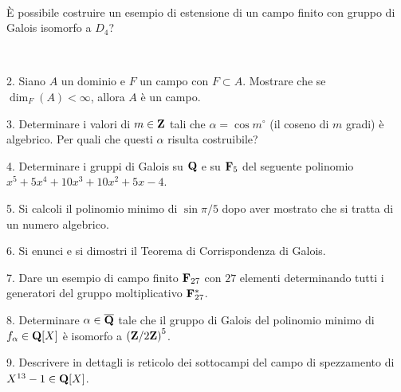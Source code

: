\ \dotfill\ \bigskip\bigskip\bigskip\vfil

 \`E possibile costruire un esempio di estensione di un campo finito con gruppo di Galois isomorfo
a $D_4$?\medskip\bigskip\bigskip

\ \dotfill\ \bigskip\bigskip\bigskip

\vfil\eject

\item{2.} Siano $A$ un dominio e $F$ un campo con $F\subset A$. Mostrare che se $\dim_F(A)<\infty$, allora $A$ \`e un campo.

\vv


\item{3.} Determinare i valori di $m\in{\bf Z}$ tali che $\alpha=\cos m^\circ$ (il  coseno di $m$ gradi) \`e algebrico. Per quali che questi $\alpha$ risulta
costruibile?
\vv

\item{4.} Determinare i gruppi di Galois su ${\bf Q}$  e su ${\bf F}_5$ del seguente polinomio $x^5 + 5x^4 + 10x^3 + 10x^2 + 5x - 4$.\ve\ \vs

\item{5.} Si calcoli il polinomio minimo di $\sin\pi/5$ dopo aver mostrato che si tratta di un numero algebrico.
\vv


\item{6.} Si enunci e si dimostri il Teorema di Corrispondenza di Galois.\vv


\item{7.}  Dare un esempio di campo finito ${\bf F}_{27}$ con $27$
elementi determinando tutti i generatori del gruppo moltiplicativo
${\bf F}_{27}^*$.\ve\ \vs

\item{8.} Determinare $\alpha\in\overline{\bf Q}$ tale che il gruppo di Galois del polinomio minimo di $f_\alpha\in{\bf Q}[X]$
\`e isomorfo a $\left({\bf Z}/2{\bf Z}\right)^5$.\vv

\item{9.} Descrivere in dettagli is reticolo dei sottocampi del campo di spezzamento di $X^{13}-1\in{\bf Q}[X]$.
\ \vst
 \bye
